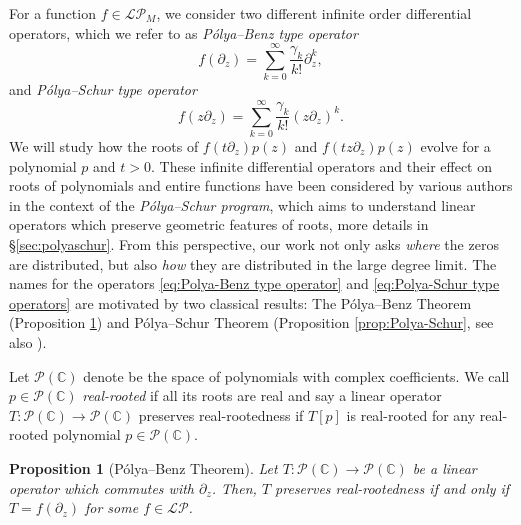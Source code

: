 \documentclass[reqno]{amsart}
\newcommand{\1}{\mathbf{1}}
\newcommand{\C}{\mathbb{C}}
\newcommand{\LP}{\mathcal{LP}}
\theoremstyle{plain}
\newtheorem{proposition}[theorem]{Proposition}
\theoremstyle{definition}
\theoremstyle{remark}
\numberwithin{equation}{section}
\begin{document}
	For a function $f\in\LP_{M}$, we consider two different infinite order differential operators, which we refer to as \emph{P\'olya--Benz type operator} \begin{equation}\label{eq:Polya-Benz type operator}
		f(\partial_{z})=\sum_{k=0}^{\infty}\frac{\gamma_{k}}{k!}\partial_{z}^{k},
	\end{equation} 
	and \emph{P\'olya--Schur type operator}
	\begin{equation}\label{eq:Polya-Schur type operators}
	f(z\partial_{z})=\sum_{k=0}^{\infty}\frac{\gamma_{k}}{k!}(z\partial_{z})^{k}.
	\end{equation} %
	We will study how the roots of $f(t\partial_z)p(z)$ and $f(tz\partial_{z})p(z)$ evolve for a polynomial $p$ and $t>0$.  These infinite differential operators and their effect on roots of polynomials and entire functions have been considered by various authors \cite{Craven-Csordas1994,Aleman-Beliaev-Hedenmalm2004,Kim--Kim2016,Cardon--deGaston2005} in the context of the \emph{P\'olya--Schur program}, which aims to understand linear operators which preserve geometric features of roots, more details in \S \ref{sec:polyaschur}. From this perspective, our work not only asks \emph{where} the zeros are distributed, but also \emph{how} they are distributed in the large degree limit.
	The names for the operators \eqref{eq:Polya-Benz type operator} and \eqref{eq:Polya-Schur type operators} are motivated by two classical results: The P\'olya--Benz Theorem (Proposition \ref{prop:Polya-Benz}) and P\'olya--Schur Theorem (Proposition \ref{prop:Polya-Schur}, see also \cite{Aleman-Beliaev-Hedenmalm2004}). 
 
	Let $\mathcal{P}(\C)$ denote be the space of polynomials with complex coefficients. We call $p\in\mathcal P(\C)$ \emph{real-rooted} if all its roots are real and say a linear operator $T:\mathcal{P}(\C)\rightarrow\mathcal{P}(\C)$ preserves real-rootedness if $T[p]$ is real-rooted for any real-rooted polynomial $p\in\mathcal P (\C)$.%
	\begin{proposition}[P\'olya--Benz Theorem]\label{prop:Polya-Benz}
	Let $T:\mathcal{P}(\C)\rightarrow\mathcal{P}(\C)$ be a linear operator which commutes with $\partial_{z}$. Then, $T$ preserves real-rootedness if and only if $T=f(\partial_z)$ for some $f\in\LP$. 
	\end{proposition} 
\end{document}
